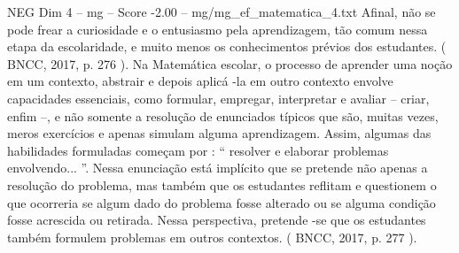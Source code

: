 \begin{textsample}{NEG Dim 4 – mg – Score -2.00 – mg/mg\_ef\_matematica\_4.txt}
Afinal, não se pode frear a curiosidade e o entusiasmo pela aprendizagem, tão comum nessa etapa da escolaridade, e muito menos os conhecimentos prévios dos estudantes. ( BNCC, 2017, p. 276 ).
Na Matemática escolar, o processo de aprender uma noção em um contexto, abstrair e depois aplicá -la em outro contexto envolve capacidades essenciais, como formular, empregar, interpretar e avaliar – criar, enfim –, e não somente a resolução de enunciados típicos que são, muitas vezes, meros exercícios e apenas simulam alguma aprendizagem.
Assim, algumas das habilidades formuladas começam por : “ resolver e elaborar problemas envolvendo... ”.
Nessa enunciação está implícito que se pretende não apenas a resolução do problema, mas também que os estudantes reflitam e questionem o que ocorreria se algum dado do problema fosse alterado ou se alguma condição fosse acrescida ou retirada.
Nessa perspectiva, pretende -se que os estudantes também formulem problemas em outros contextos. ( BNCC, 2017, p. 277 ).

\end{textsample}
